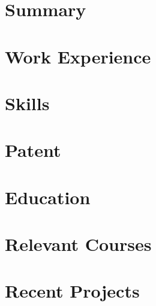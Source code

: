 \documentclass[letter,10pt]{article}
\begin{document}
\section{Summary}


\section{Work Experience}


\section{Skills}


\section{Patent}


\section{Education}


\section{Relevant Courses}


\section{Recent Projects}

\end{document}
